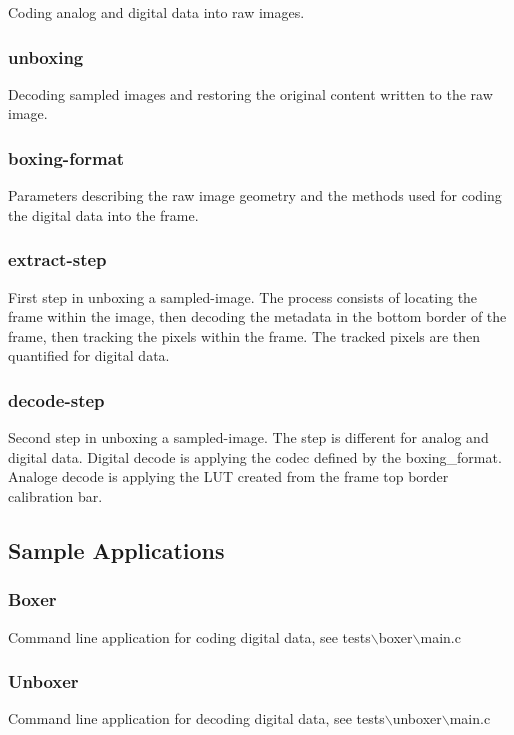 Coding analog and digital data into raw images. \hypertarget{index_unboxing}{}\subsubsection{unboxing}\label{index_unboxing}
Decoding sampled images and restoring the original content written to the raw image. \hypertarget{index_boxing-format}{}\subsubsection{boxing-\/format}\label{index_boxing-format}
Parameters describing the raw image geometry and the methods used for coding the digital data into the frame. \hypertarget{index_extract-step}{}\subsubsection{extract-\/step}\label{index_extract-step}
First step in unboxing a sampled-\/image. The process consists of locating the frame within the image, then decoding the metadata in the bottom border of the frame, then tracking the pixels within the frame. The tracked pixels are then quantified for digital data. \hypertarget{index_decode-step}{}\subsubsection{decode-\/step}\label{index_decode-step}
Second step in unboxing a sampled-\/image. The step is different for analog and digital data. Digital decode is applying the codec defined by the boxing\_\-format. Analoge decode is applying the LUT created from the frame top border calibration bar.\hypertarget{index_Samples}{}\subsection{Sample Applications}\label{index_Samples}
\hypertarget{index_Boxer}{}\subsubsection{Boxer}\label{index_Boxer}
Command line application for coding digital data, see tests$\backslash$boxer$\backslash$main.c\hypertarget{index_Unboxer}{}\subsubsection{Unboxer}\label{index_Unboxer}
Command line application for decoding digital data, see tests$\backslash$unboxer$\backslash$main.c 